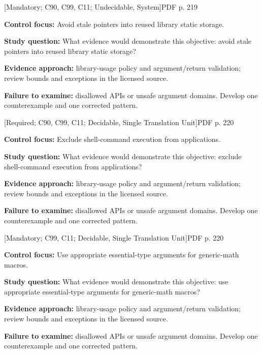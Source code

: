 \documentclass[10pt,letterpaper]{article}
\begin{document}
\smallskip
{}
 \textsf{\footnotesize [Mandatory; C90, C99, C11; Undecidable, System]}\hfill{\footnotesize PDF p. 219}\par
\textbf{Control focus:} Avoid stale pointers into reused library static storage.\par
\textbf{Study question:} What evidence would demonstrate this objective: avoid stale pointers into reused library static storage?\par
\textbf{Evidence approach:} library-usage policy and argument/return validation; review bounds and exceptions in the licensed source.\par
\textbf{Failure to examine:} disallowed APIs or unsafe argument domains. Develop one counterexample and one corrected pattern.\par
\smallskip
{}
 \textsf{\footnotesize [Required; C90, C99, C11; Decidable, Single Translation Unit]}\hfill{\footnotesize PDF p. 220}\par
\textbf{Control focus:} Exclude shell-command execution from applications.\par
\textbf{Study question:} What evidence would demonstrate this objective: exclude shell-command execution from applications?\par
\textbf{Evidence approach:} library-usage policy and argument/return validation; review bounds and exceptions in the licensed source.\par
\textbf{Failure to examine:} disallowed APIs or unsafe argument domains. Develop one counterexample and one corrected pattern.\par
\smallskip
{}
 \textsf{\footnotesize [Mandatory; C99, C11; Decidable, Single Translation Unit]}\hfill{\footnotesize PDF p. 220}\par
\textbf{Control focus:} Use appropriate essential-type arguments for generic-math macros.\par
\textbf{Study question:} What evidence would demonstrate this objective: use appropriate essential-type arguments for generic-math macros?\par
\textbf{Evidence approach:} library-usage policy and argument/return validation; review bounds and exceptions in the licensed source.\par
\textbf{Failure to examine:} disallowed APIs or unsafe argument domains. Develop one counterexample and one corrected pattern.\par
\end{document}
